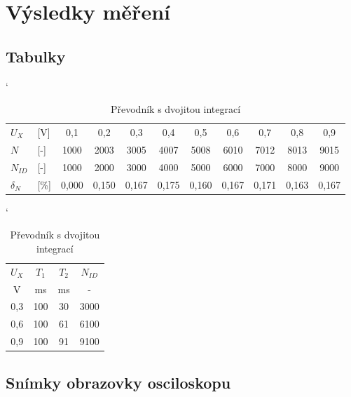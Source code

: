 \documentclass[a4paper, czech]{article}
\begin{document}
\section{Výsledky měření}

\subsection{Tabulky}

\begin{table}[H]
    \catcode`
    \centering
    \caption{Převodník s dvojitou integrací}
    \begin{tabular}{ll|ccccccccc}
        \toprule
        $U_X$  & [V]  & 0,1   & 0,2   & 0,3   & 0,4   & 0,5   & 0,6   & 0,7   & 0,8   & 0,9   \\
        \cmidrule(rl){1-11}
        $N$   & [-]  & 1000  & 2003  & 3005  & 4007  & 5008  & 6010  & 7012  & 8013  & 9015  \\
        $N_{ID}$ & [-]  & 1000  & 2000  & 3000  & 4000  & 5000  & 6000  & 7000  & 8000  & 9000  \\
        $\delta_N$  & [\%] & 0,000 & 0,150 & 0,167 & 0,175 & 0,160 & 0,167 & 0,171 & 0,163 & 0,167 \\
        \bottomrule
    \end{tabular}
\end{table}

\begin{table}[H]
    \catcode`
    \centering
    \caption{Převodník s dvojitou integrací}
    \begin{tabular}{cccc}
        \toprule
        $U_X$  & $T_1$  & $T_2$ & $N_{ID}$  \\
        \cmidrule(rl){1-1}
        \cmidrule(rl){2-2}
        \cmidrule(rl){3-3}
        \cmidrule(rl){4-4}
        V   & ms  & ms & -    \\
        \midrule
        0,3 & 100 & 30 & 3000 \\
        0,6 & 100 & 61 & 6100 \\
        0,9 & 100 & 91 & 9100 \\
        \bottomrule
    \end{tabular}
\end{table}

\subsection{Snímky obrazovky osciloskopu}
\end{document}
